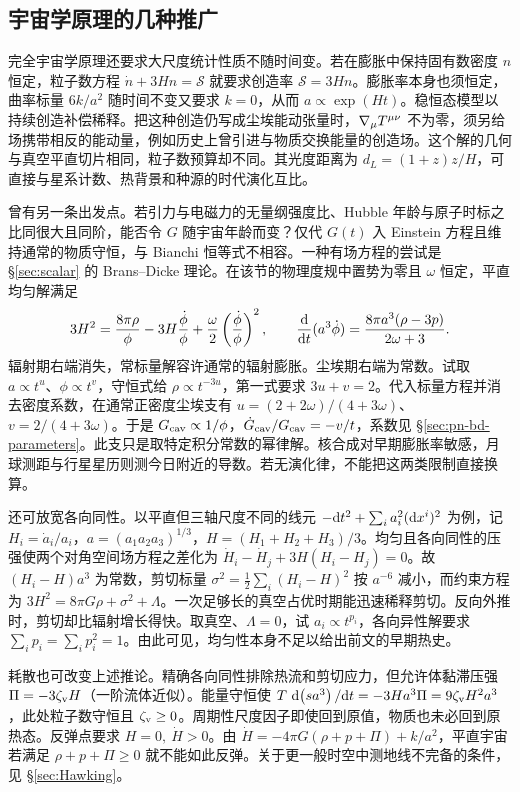 \subsection{宇宙学原理的几种推广}\label{sec:cosmo-alternatives}

完全宇宙学原理还要求大尺度统计性质不随时间变。若在膨胀中保持固有数密度 $n$ 恒定，粒子数方程 $\dot n+3Hn=\mathcal S$ 就要求创造率 $\mathcal S=3Hn$。膨胀率本身也须恒定，曲率标量 $6k/a^2$ 随时间不变又要求 $k=0$，从而 $a\propto\exp(Ht)$。稳恒态模型以持续创造补偿稀释。把这种创造仍写成尘埃能动张量时，$\nabla_\mu T^{\mu\nu}$ 不为零，须另给场携带相反的能动量，例如历史上曾引进与物质交换能量的创造场。这个解的几何与真空平直切片相同，粒子数预算却不同。其光度距离为 $d_L=(1+z)z/H$，可直接与星系计数、热背景和种源的时代演化互比。

曾有另一条出发点。若引力与电磁力的无量纲强度比、Hubble 年龄与原子时标之比同很大且同阶，能否令 $G$ 随宇宙年龄而变？仅代 $G(t)$ 入 Einstein 方程且维持通常的物质守恒，与 Bianchi 恒等式不相容。一种有场方程的尝试是 \S\ref{sec:scalar} 的 Brans--Dicke 理论。在该节的物理度规中置势为零且 $\omega$ 恒定，平直均匀解满足
\[
 3H^2=\frac{8\pi\rho}{\phi}-3H\frac{\dot\phi}{\phi}
             +\frac{\omega}{2}\left(\frac{\dot\phi}{\phi}\right)^2,\qquad
 \frac{\dd}{\dd t}(a^3\dot\phi)=\frac{8\pi a^3(\rho-3p)}{2\omega+3}.
\]
辐射期右端消失，常标量解容许通常的辐射膨胀。尘埃期右端为常数。试取 $a\propto t^u$、$\phi\propto t^v$，守恒式给 $\rho\propto t^{-3u}$，第一式要求 $3u+v=2$。代入标量方程并消去密度系数，在通常正密度尘埃支有 $u=(2+2\omega)/(4+3\omega)$、$v=2/(4+3\omega)$。于是 $G_{\rm cav}\propto1/\phi$，$\dot G_{\rm cav}/G_{\rm cav}=-v/t$，系数见 \S\ref{sec:pn-bd-parameters}。此支只是取特定积分常数的幂律解。核合成对早期膨胀率敏感，月球测距与行星星历则测今日附近的导数。若无演化律，不能把这两类限制直接换算。

还可放宽各向同性。以平直但三轴尺度不同的线元 $-\dd t^2+\sum_i a_i^2(\dd x^i)^2$ 为例，记 $H_i=\dot a_i/a_i$，$a=(a_1a_2a_3)^{1/3}$，$H=(H_1+H_2+H_3)/3$。均匀且各向同性的压强使两个对角空间场方程之差化为 $\dot H_i-\dot H_j+3H(H_i-H_j)=0$。故 $(H_i-H)a^3$ 为常数，剪切标量 $\sigma^2=\frac12\sum_i(H_i-H)^2$ 按 $a^{-6}$ 减小，而约束方程为 $3H^2=8\pi G\rho+\sigma^2+\Lambda$。一次足够长的真空占优时期能迅速稀释剪切。反向外推时，剪切却比辐射增长得快。取真空、$\Lambda=0$，试 $a_i\propto t^{p_i}$，各向异性解要求 $\sum_i p_i=\sum_i p_i^2=1$。由此可见，均匀性本身不足以给出前文的早期热史。

耗散也可改变上述推论。精确各向同性排除热流和剪切应力，但允许体黏滞压强 $\Pi=-3\zeta_{\rm v}H$（一阶流体近似）。能量守恒使 $T\,\dd(sa^3)/\dd t=-3Ha^3\Pi=9\zeta_{\rm v}H^2a^3$，此处粒子数守恒且 $\zeta_{\rm v}\geq0$。周期性尺度因子即使回到原值，物质也未必回到原热态。反弹点要求 $H=0,\ \dot H>0$。由 $\dot H=-4\pi G(\rho+p+\Pi)+k/a^2$，平直宇宙若满足 $\rho+p+\Pi\geq0$ 就不能如此反弹。关于更一般时空中测地线不完备的条件，见 \S\ref{sec:Hawking}。

